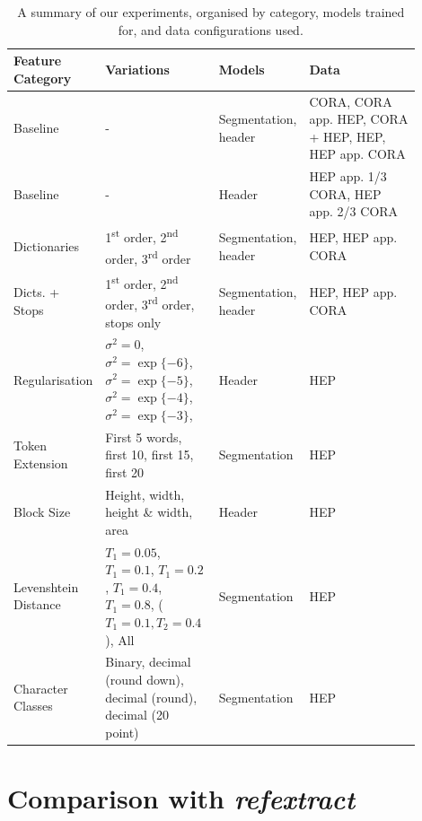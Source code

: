\begin{table}[h]
\begin{center}
\begin{tabular}{ | p{0.2\linewidth} | p{0.25\linewidth} | p{0.15\linewidth} | p{0.3\linewidth} |}
\hline
Feature Category & Variations & Models & Data\\
\hline
Baseline & - & Segmentation, header & CORA, CORA app. HEP, CORA + HEP, HEP, HEP app. CORA \\
\hline
Baseline & - & Header & HEP app. 1/3 CORA, HEP app. 2/3 CORA \\
\hline
Dictionaries & 1\textsuperscript{st} order, 2\textsuperscript{nd} order, 3\textsuperscript{rd} order & Segmentation, header & HEP, HEP app. CORA \\
\hline
Dicts. + Stops & 1\textsuperscript{st} order, 2\textsuperscript{nd} order, 3\textsuperscript{rd} order, stops only & Segmentation, header & HEP, HEP app. CORA \\
\hline
Regularisation & $\sigma^2=0$, $\sigma^2=\exp\{-6\}$, $\sigma^2=\exp\{-5\}$, $\sigma^2=\exp\{-4\}$, $\sigma^2=\exp\{-3\}$, & Header & HEP \\
\hline
Token Extension & First 5 words, first 10, first 15, first 20 & Segmentation & HEP \\
\hline
Block Size & Height, width, height \& width, area & Header & HEP \\
\hline
Levenshtein Distance & $T_1 = 0.05$, $T_1 = 0.1$, $T_1 = 0.2$, $T_1 = 0.4$, $T_1 = 0.8$, ($T_1 = 0.1, T_2 = 0.4$), All & Segmentation & HEP \\
\hline
Character Classes & Binary, decimal (round down), decimal (round), decimal (20 point) & Segmentation & HEP \\
\hline
\end{tabular}
\caption[A summary of our experiments, organised by category, models trained for, and data configurations used.]{A summary of our experiments, organised by category, models trained for, and data configurations used.}
\label{table:experiments}
\end{center}
\end{table}

\section{Comparison with \emph{refextract}}
\label{sec:refextract}

